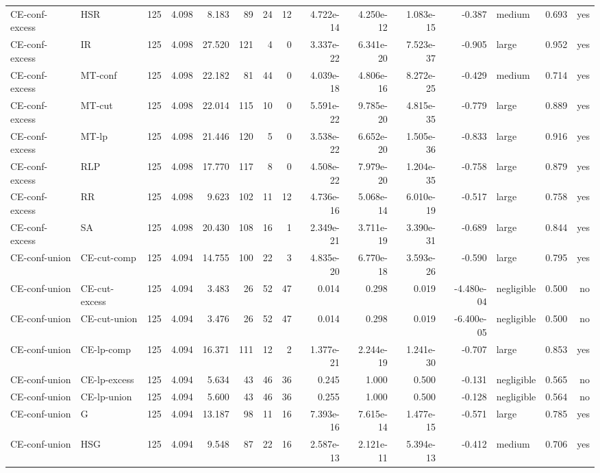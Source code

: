 \begin{table}[htbp]
\begin{tabular}{llrrrrrrrrrrlrr}
CE-conf-excess & HSR & 125 & 4.098 & 8.183 & 89 & 24 & 12 & 4.722e-14 & 4.250e-12 & 1.083e-15 & -0.387 & medium & 0.693 & yes \\
CE-conf-excess & IR & 125 & 4.098 & 27.520 & 121 & 4 & 0 & 3.337e-22 & 6.341e-20 & 7.523e-37 & -0.905 & large & 0.952 & yes \\
CE-conf-excess & MT-conf & 125 & 4.098 & 22.182 & 81 & 44 & 0 & 4.039e-18 & 4.806e-16 & 8.272e-25 & -0.429 & medium & 0.714 & yes \\
CE-conf-excess & MT-cut & 125 & 4.098 & 22.014 & 115 & 10 & 0 & 5.591e-22 & 9.785e-20 & 4.815e-35 & -0.779 & large & 0.889 & yes \\
CE-conf-excess & MT-lp & 125 & 4.098 & 21.446 & 120 & 5 & 0 & 3.538e-22 & 6.652e-20 & 1.505e-36 & -0.833 & large & 0.916 & yes \\
CE-conf-excess & RLP & 125 & 4.098 & 17.770 & 117 & 8 & 0 & 4.508e-22 & 7.979e-20 & 1.204e-35 & -0.758 & large & 0.879 & yes \\
CE-conf-excess & RR & 125 & 4.098 & 9.623 & 102 & 11 & 12 & 4.736e-16 & 5.068e-14 & 6.010e-19 & -0.517 & large & 0.758 & yes \\
CE-conf-excess & SA & 125 & 4.098 & 20.430 & 108 & 16 & 1 & 2.349e-21 & 3.711e-19 & 3.390e-31 & -0.689 & large & 0.844 & yes \\
CE-conf-union & CE-cut-comp & 125 & 4.094 & 14.755 & 100 & 22 & 3 & 4.835e-20 & 6.770e-18 & 3.593e-26 & -0.590 & large & 0.795 & yes \\
CE-conf-union & CE-cut-excess & 125 & 4.094 & 3.483 & 26 & 52 & 47 & 0.014 & 0.298 & 0.019 & -4.480e-04 & negligible & 0.500 & no \\
CE-conf-union & CE-cut-union & 125 & 4.094 & 3.476 & 26 & 52 & 47 & 0.014 & 0.298 & 0.019 & -6.400e-05 & negligible & 0.500 & no \\
CE-conf-union & CE-lp-comp & 125 & 4.094 & 16.371 & 111 & 12 & 2 & 1.377e-21 & 2.244e-19 & 1.241e-30 & -0.707 & large & 0.853 & yes \\
CE-conf-union & CE-lp-excess & 125 & 4.094 & 5.634 & 43 & 46 & 36 & 0.245 & 1.000 & 0.500 & -0.131 & negligible & 0.565 & no \\
CE-conf-union & CE-lp-union & 125 & 4.094 & 5.600 & 43 & 46 & 36 & 0.255 & 1.000 & 0.500 & -0.128 & negligible & 0.564 & no \\
CE-conf-union & G & 125 & 4.094 & 13.187 & 98 & 11 & 16 & 7.393e-16 & 7.615e-14 & 1.477e-15 & -0.571 & large & 0.785 & yes \\
CE-conf-union & HSG & 125 & 4.094 & 9.548 & 87 & 22 & 16 & 2.587e-13 & 2.121e-11 & 5.394e-13 & -0.412 & medium & 0.706 & yes \\

\end{tabular}
\end{table}
